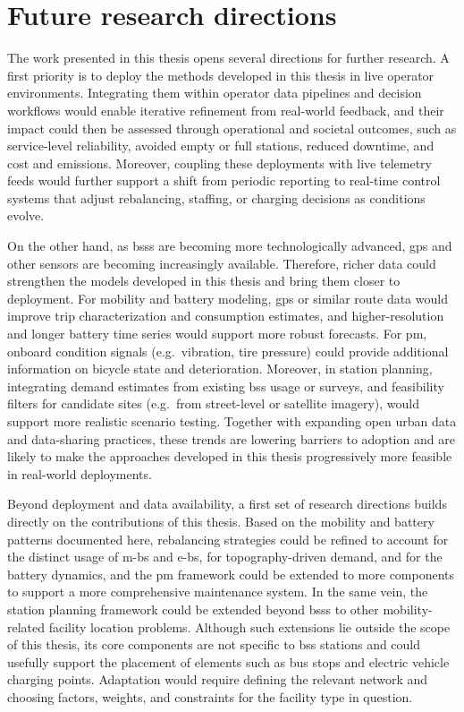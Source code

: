\section{Future research directions}
\label{sec:conclusions_future}

The work presented in this thesis opens several directions for further research. A first priority is to deploy the methods developed in this thesis in live operator environments. Integrating them within operator data pipelines and decision workflows would enable iterative refinement from real-world feedback, and their impact could then be assessed through operational and societal outcomes, such as service-level reliability, avoided empty or full stations, reduced downtime, and cost and emissions. Moreover, coupling these deployments with live telemetry feeds would further support a shift from periodic reporting to real-time control systems that adjust rebalancing, staffing, or charging decisions as conditions evolve.

On the other hand, as \acp{bss} are becoming more technologically advanced, \ac{gps} and other sensors are becoming increasingly available. Therefore, richer data could strengthen the models developed in this thesis and bring them closer to deployment. For mobility and battery modeling, \ac{gps} or similar route data would improve trip characterization and consumption estimates, and higher-resolution and longer battery time series would support more robust forecasts. For \ac{pm}, onboard condition signals (e.g.\ vibration, tire pressure) could provide additional information on bicycle state and deterioration. Moreover, in station planning, integrating demand estimates from existing \ac{bss} usage or surveys, and feasibility filters for candidate sites (e.g.\ from street-level or satellite imagery), would support more realistic scenario testing. Together with expanding open urban data and data-sharing practices, these trends are lowering barriers to adoption and are likely to make the approaches developed in this thesis progressively more feasible in real-world deployments.

Beyond deployment and data availability, a first set of research directions builds directly on the contributions of this thesis. Based on the mobility and battery patterns documented here, rebalancing strategies could be refined to account for the distinct usage of \acp{m-b} and \acp{e-b}, for topography-driven demand, and for the battery dynamics, and the \ac{pm} framework could be extended to more components to support a more comprehensive maintenance system. In the same vein, the station planning framework could be extended beyond \acp{bss} to other mobility-related facility location problems. Although such extensions lie outside the scope of this thesis, its core components are not specific to \ac{bss} stations and could usefully support the placement of elements such as bus stops and electric vehicle charging points. Adaptation would require defining the relevant network and choosing factors, weights, and constraints for the facility type in question.

